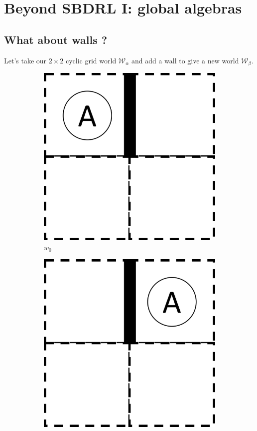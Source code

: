 \chapter{
Beyond SBDRL I: global algebras
}

\section{What about walls ?}

Let's take our $2 \times 2$ cyclic grid world $\mathscr{W}_{\alpha}$ and add a wall to give a new world $\mathscr{W}_{\beta}$.

\begin{figure}[H]
  \centering
    \begin{subfigure}[b]{0.45\linewidth}
        \centering
        \includegraphics[width=0.5\linewidth]{5BeyondSBDRLGlobalAlgebras/Images/2x2_with_wall_world_states/w0.png}
        \caption{$w_{0}$}
        \vspace{0.25cm}
    \end{subfigure}
    \begin{subfigure}[b]{0.45\linewidth}
        \centering
        \includegraphics[width=0.5\linewidth]{5BeyondSBDRLGlobalAlgebras/Images/2x2_with_wall_world_states/w1.png}

\end{subfigure}
\end{figure}
